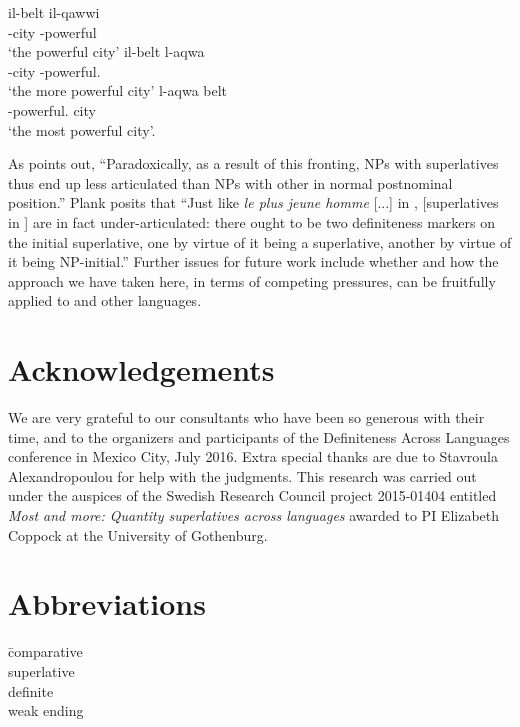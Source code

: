 \documentclass[output=paper
,modfonts
,nonflat]{langsci/langscibook}
\begin{document}
\ea \label{ex:coppockstrand:110}
\begin{xlist}
\ex \label{ex:coppockstrand:110a}
\gll  il-belt il-qawwi\\
-city -powerful\\ 
\glt `the powerful city'
\ex \label{ex:coppockstrand:110b}
\gll  il-belt l-aqwa\\
-city -powerful.\cmpr{}\\
\glt `the more powerful city' 
\ex \label{ex:coppockstrand:110c}
\gll  l-aqwa belt\\
-powerful.\cmpr{} city\\
\glt  `the most powerful city'.
\end{xlist}
\z

As \citet[361--362]{Plank2003} points out, ``Paradoxically, as a result of this fronting, NPs with superlatives thus end up less articulated than NPs with other  in normal postnominal position.'' Plank posits that ``Just like \textit{le plus jeune homme} [...] in , [superlatives in ] are in fact under-articulated: there ought to be two definiteness markers on the initial superlative, one by virtue of it being a superlative, another by virtue of it being NP-initial.'' Further issues for future work include whether and how the approach we have taken here, in terms of competing pressures, can be fruitfully applied to  and other  languages.

\section*{Acknowledgements}

We are very grateful to our consultants who have been so generous with their time, and to the organizers and participants of the Definiteness Across Languages conference in Mexico City, July 2016. Extra special thanks are due to Stavroula Alexandropoulou for help with the  judgments. This research was carried out under the auspices of the Swedish Research Council project 2015-01404 entitled \textit{Most and more: Quantity superlatives across languages} awarded to PI Elizabeth Coppock at the University of Gothenburg.

\section*{Abbreviations}
\begin{multicols}{2}
\begin{tabbing}
	\cmpr{}\hspace{1em} \= comparative\\ \kill
	\sprl{} \> superlative\\
	 \> definite\\
	\wk{} \> weak ending
\end{tabbing}
\end{multicols}

{\sloppy
\printbibliography[heading=subbibliography,notkeyword=this]
}
\end{document}

